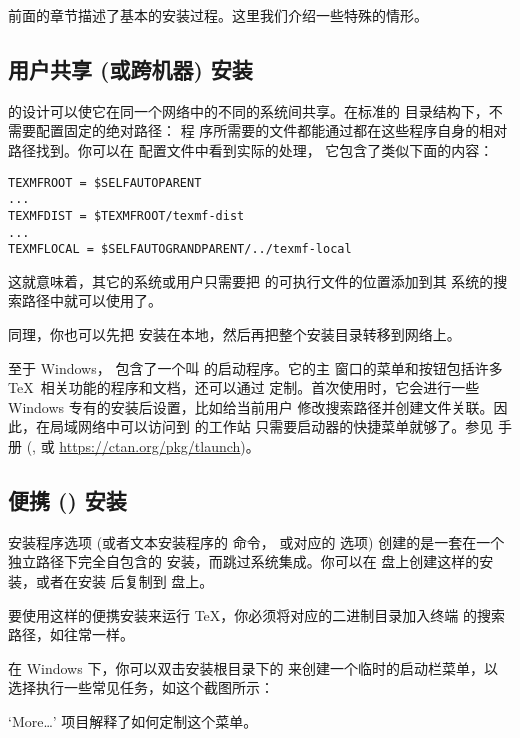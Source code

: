 \documentclass{article}
\begin{document}
前面的章节描述了基本的安装过程。这里我们介绍一些特殊的情形。

\subsection{用户共享 (或跨机器) 安装}
\label{sec:sharedinstall}

\TL{} 的设计可以使它在同一个网络中的不同的系统间共享。在标准的
目录结构下，不需要配置固定的绝对路径：\TL{} 程
序所需要的文件都能通过都在这些程序自身的相对路径找到。你可以在
 配置文件中看到实际的处理，
它包含了类似下面的内容：
\begin{verbatim}
TEXMFROOT = $SELFAUTOPARENT
...
TEXMFDIST = $TEXMFROOT/texmf-dist
...
TEXMFLOCAL = $SELFAUTOGRANDPARENT/../texmf-local
\end{verbatim}
这就意味着，其它的系统或用户只需要把 \TL{} 的可执行文件的位置添加到其
系统的搜索路径中就可以使用了。

同理，你也可以先把 \TL{} 安装在本地，然后再把整个安装目录转移到网络上。

至于 Windows，\TL{} 包含了一个叫  的启动程序。它的主
窗口的菜单和按钮包括许多 \TeX\ 相关功能的程序和文档，还可以通过 
定制。首次使用时，它会进行一些 Windows 专有的安装后设置，比如给当前用户
修改搜索路径并创建文件关联。因此，在局域网络中可以访问到 \TL{} 的工作站
只需要启动器的快捷菜单就够了。参见  手册 (,
或 \url{https://ctan.org/pkg/tlaunch})。

\subsection{便携 (\USB{}) 安装}
\label{sec:portable-tl}

 安装程序选项 (或者文本安装程序的  命令，
或对应的 \GUI{} 选项) 创建的是一套在一个独立路径下完全自包含的 \TL{}
安装，而跳过系统集成。你可以在 \USB{} 盘上创建这样的安装，或者在安装
后复制到 \USB{} 盘上。

要使用这样的便携安装来运行 \TeX{}，你必须将对应的二进制目录加入终端
的搜索路径，如往常一样。

在 Windows 下，你可以双击安装根目录下的 
来创建一个临时的启动栏菜单，以选择执行一些常见任务，如这个截图所示：

\medskip
{}
\smallskip

\noindent `More\ldots' 项目解释了如何定制这个菜单。
\end{document}
